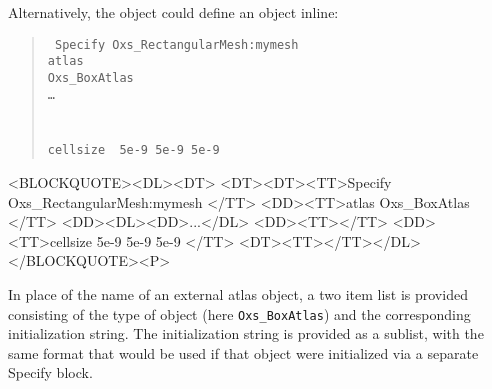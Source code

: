 Alternatively, the  object could define an
 object inline:
\begin{latexonly}
\begin{quote}\tt
Specify Oxs\_RectangularMesh:mymesh \ocb \\
\bi atlas \ocb\\
\bi\bi Oxs\_BoxAtlas \ocb\\
\bi\bi\bi\ldots\\
\bi\bi\ccb\\
\bi\ccb\\
\bi cellsize \ocb\ 5e-9 5e-9 5e-9 \ccb\\
\ccb
\end{quote}
\end{latexonly}
\begin{rawhtml}<BLOCKQUOTE><DL><DT>
<DT><DT><TT>Specify Oxs_RectangularMesh:mymesh {</TT>
<DD><TT>atlas { Oxs_BoxAtlas {</TT>
<DD><DL><DD>...</DL>
<DD><TT>}}</TT>
<DD><TT>cellsize { 5e-9 5e-9 5e-9 }</TT>
<DT><TT>}</TT></DL>
</BLOCKQUOTE><P>
\end{rawhtml}
In place of the name of an external atlas object, a
two item list is provided consisting of the type of object (here
\texttt{Oxs\_BoxAtlas}) and the corresponding initialization
string.  The initialization string is provided as a sublist, with the
same format that would be used if that object were initialized via a
separate Specify block.

